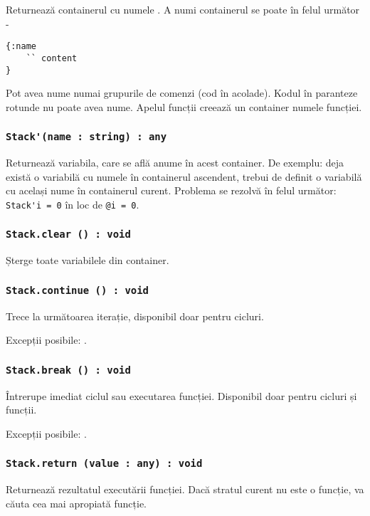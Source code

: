 Returnează containerul cu numele . A numi containerul se poate în felul următor -
\begin{lstlisting}[numbers=none]
{:name
	`` content
}
\end{lstlisting}
Pot avea nume numai grupurile de comenzi (cod în acolade). Kodul în paranteze rotunde nu poate avea nume. Apelul funcții creează un container numele funcției.


\subsubsection{\lstinline|Stack'(name : string) : any|}

Returnează variabila, care se află anume în acest container. De exemplu: deja există o variabilă cu numele  în containerul ascendent, trebui de definit o variabilă cu același nume în containerul curent. Problema se rezolvă în felul următor: \lstinline|Stack'i = 0| în loc de \lstinline|@i = 0|.

\subsubsection{\lstinline|Stack.clear () : void|}

Șterge toate variabilele din container.

\subsubsection{\lstinline|Stack.continue () : void|}

Trece la următoarea iterație, disponibil doar pentru cicluri.

Excepții posibile: .

\subsubsection{\lstinline|Stack.break () : void|}

Întrerupe imediat ciclul sau executarea funcției. Disponibil doar pentru cicluri și funcții.

Excepții posibile: .

\subsubsection{\lstinline|Stack.return (value : any) : void|}

Returnează rezultatul executării funcției. Dacă stratul curent nu este o funcție, va căuta cea mai apropiată funcție.

